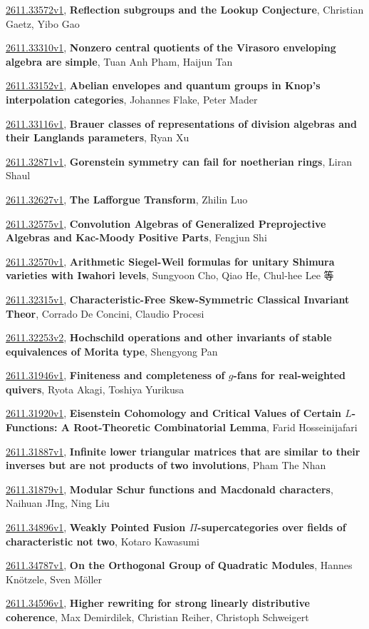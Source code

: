\documentclass[9pt, a4paper]{article}
\theoremstyle{plain}
\theoremstyle{definition}
\theoremstyle{remark}
\newcommand{\arxiv}[3]{\href{https://arxiv.org/abs/#1}{#1}, \textbf{\textcolor{arxivblue}{#2}}, #3}
\begin{document}
\arxiv{2611.33572v1}{Reflection subgroups and the Lookup Conjecture}{Christian Gaetz, Yibo Gao}

\arxiv{2611.33310v1}{Nonzero central quotients of the Virasoro enveloping algebra are simple}{Tuan Anh Pham, Haijun Tan}

\arxiv{2611.33152v1}{Abelian envelopes and quantum groups in Knop's interpolation categories}{Johannes Flake, Peter Mader}

\arxiv{2611.33116v1}{Brauer classes of representations of division algebras and their Langlands parameters}{Ryan Xu}

\arxiv{2611.32871v1}{Gorenstein symmetry can fail for noetherian rings}{Liran Shaul}

\arxiv{2611.32627v1}{The Lafforgue Transform}{Zhilin Luo}

\arxiv{2611.32575v1}{Convolution Algebras of Generalized Preprojective Algebras and Kac-Moody Positive Parts}{Fengjun Shi}

\arxiv{2611.32570v1}{Arithmetic Siegel-Weil formulas for unitary Shimura varieties with Iwahori levels}{Sungyoon Cho, Qiao He, Chul-hee Lee 等}

\arxiv{2611.32315v1}{Characteristic-Free Skew-Symmetric Classical Invariant Theor}{Corrado De Concini, Claudio Procesi}

\arxiv{2611.32253v2}{Hochschild operations and other invariants of stable equivalences of Morita type}{Shengyong Pan}

\arxiv{2611.31946v1}{Finiteness and completeness of $g$-fans for real-weighted quivers}{Ryota Akagi, Toshiya Yurikusa}

\arxiv{2611.31920v1}{Eisenstein Cohomology and Critical Values of Certain \(L\)-Functions: A Root-Theoretic Combinatorial Lemma}{Farid Hosseinijafari}

\arxiv{2611.31887v1}{Infinite lower triangular matrices that are similar to their inverses but are not products of two involutions}{Pham The Nhan}

\arxiv{2611.31879v1}{Modular Schur functions and Macdonald characters}{Naihuan JIng, Ning Liu}

\arxiv{2611.34896v1}{Weakly Pointed Fusion $Π$-supercategories over fields of characteristic not two}{Kotaro Kawasumi}

\arxiv{2611.34787v1}{On the Orthogonal Group of Quadratic Modules}{Hannes Knötzele, Sven Möller}

\arxiv{2611.34596v1}{Higher rewriting for strong linearly distributive coherence}{Max Demirdilek, Christian Reiher, Christoph Schweigert}
\end{document}
